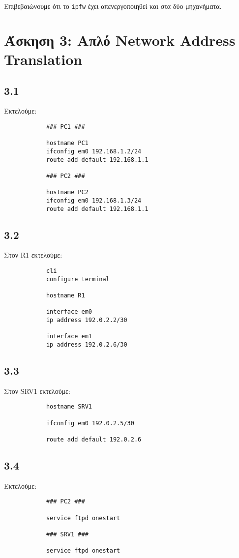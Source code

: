 \documentclass[a4paper, 12pt]{article}
\begin{document}
		Επιβεβαιώνουμε ότι το \verb|ipfw| έχει απενεργοποιηθεί και στα δύο μηχανήματα.

\section*{Άσκηση 3: Απλό Network Address Translation}

	\subsection*{3.1}
		Εκτελούμε:
		
		\begin{verbatim}
			### PC1 ###
			
			hostname PC1
			ifconfig em0 192.168.1.2/24
			route add default 192.168.1.1
			
			### PC2 ###
			
			hostname PC2
			ifconfig em0 192.168.1.3/24
			route add default 192.168.1.1
		\end{verbatim}

	\subsection*{3.2}
		Στον R1 εκτελούμε:
		
		\begin{verbatim}
			cli
			configure terminal
			
			hostname R1
			
			interface em0
			ip address 192.0.2.2/30
			
			interface em1
			ip address 192.0.2.6/30
		\end{verbatim}

	\subsection*{3.3}
		Στον SRV1 εκτελούμε:
		
		\begin{verbatim}
			hostname SRV1
			
			ifconfig em0 192.0.2.5/30
			
			route add default 192.0.2.6
		\end{verbatim}

	\subsection*{3.4}
		Εκτελούμε:
		
		\begin{verbatim}
			### PC2 ### 
			
			service ftpd onestart
			
			### SRV1 ###
			
			service ftpd onestart
		\end{verbatim}
\end{document}
